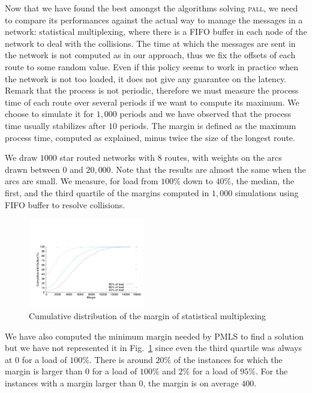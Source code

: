 \documentclass[10pt, conference, letterpaper]{IEEEtran}
\newcommand\pall{\textsc{pall}\xspace}
\begin{document}
     
     
     Now that we have found the best amongst the algorithms solving \pall, we need to compare its performances against the actual way to manage the messages in a network:  statistical multiplexing, where there is a FIFO buffer in each node of the network to deal with the collisions. The time at which the messages are sent in the network is not computed as in our approach, thus we fix the offsets of each route to some random value.
     Even if this policy seems to work in practice when the network is not too loaded, it does not give any guarantee on the latency. Remark that the process is not periodic, therefore we must measure the process time of each route over several periods if we want to compute its maximum. We choose to simulate it for $1,000$ periods and we have observed that the process time usually stabilizes after $10$ periods. The margin is defined as the maximum process time, computed as explained, minus twice the size of the longest route. 
	    
     
     We draw $1000$ star routed networks with $8$ routes, with weights on the arcs drawn between $0$ and $20,000$. Note that the results are almost the same when the arcs are small. We measure, for load from $100\%$ down to $40\%$, the median, the first, and the third quartile of the margins computed in $1,000$ simulations using FIFO buffer to resolve collisions.

      
    \begin{figure}
       \begin{center}
      \includegraphics[width = 0.45\textwidth]{stochastic.pdf}
      \end{center}
      \caption{Cumulative distribution of the margin of statistical multiplexing}
      \label{fig:sto}
     \end{figure}    
     
     We have also computed the minimum margin needed by PMLS to find a solution but we have not represented it in Fig.~\ref{fig:sto} since even the third quartile was always at $0$ for a load of $100\%$. There is around $20\%$ of the instances for which the margin is larger than $0$ for a load of $100\%$ and $2\%$ for a load of $95\%$. For the instances with a margin larger than $0$, the margin is on average $400$.
     
\end{document}
